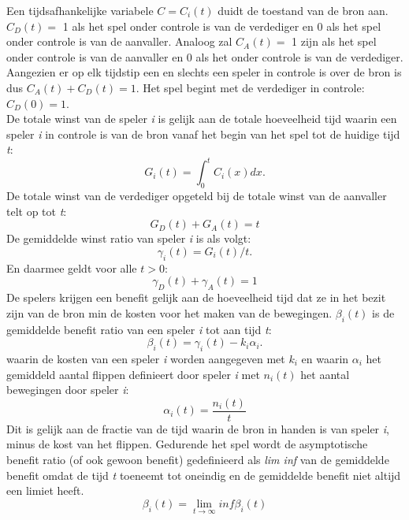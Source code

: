 \documentclass[master=cws, masteroption=vs,english]{kulemt}
\begin{document}
\begin{abstract*}
Een tijdsafhankelijke variabele $ C = C_{i}(t) $ duidt de toestand van de bron aan.
$ C_{D}(t) =$  1 als het spel onder controle is van de verdediger en 0 als het spel onder controle is van de aanvaller. Analoog zal $ C_{A}(t) =$ 1 zijn als het spel onder controle is van de aanvaller en 0 als het onder controle is van de verdediger. Aangezien er op elk tijdstip een en slechts een speler in controle is over de bron is dus  $ C_{A}(t) +  C_{D}(t) = 1 $.
Het spel begint met de verdediger in controle: $ C_{D}(0) = 1 $. \\



De totale winst van de speler \textit{i} is gelijk aan de totale hoeveelheid tijd waarin een speler \textit{i} in controle is van de bron vanaf het begin van het spel tot de huidige tijd \textit{t}:
\begin{equation}
G_{i}(t) = \int_0^t \! C_{i}(x) dx.
\end{equation}
De totale winst van de verdediger opgeteld bij de totale winst van de aanvaller telt op tot \textit{t}:
\begin{equation} 
G_{D}(t) + G_{A}(t) = t
\end{equation}
De gemiddelde winst ratio van speler \textit{i} is als volgt:
\begin{equation}
\gamma_{i}(t) = G_{i}(t) / t.
\end{equation}
En daarmee geldt voor alle $ t> 0 $:
\begin{equation} 
\gamma_{D}(t) + \gamma_{A}(t) = 1
\end{equation}
De spelers krijgen een benefit gelijk aan de hoeveelheid tijd dat ze in het bezit zijn van de bron min de kosten voor het maken van de bewegingen. 
$ \beta_{i}(t) $ is de gemiddelde benefit ratio van een speler \textit{i} tot aan tijd \textit{t}:
\begin{equation}
\beta_{i}(t) = \gamma_{i}(t) - k_{i} \alpha_{i}.
\end{equation}
waarin de kosten van een speler \textit{i} worden aangegeven met $ k_{i} $ en waarin $\alpha_{i}$ het gemiddeld aantal flippen definieert door speler \textit{i} met $n_{i}(t)$ het aantal bewegingen door speler \textit{i}:
\begin{equation}
\alpha_{i}(t) = \dfrac{n_{i}(t)}{t}
\end{equation}
Dit is gelijk aan de fractie van de tijd waarin de bron in handen is van speler \textit{i}, minus de kost van het flippen.
Gedurende het spel wordt de asymptotische benefit ratio (of ook gewoon benefit) gedefinieerd als \textit{lim inf} van de gemiddelde benefit omdat de tijd \textit{t} toeneemt tot oneindig en de gemiddelde benefit niet altijd een limiet heeft.
\begin{equation}
\beta_{i} (t) = \lim_{t \to \infty } inf \beta_{i}(t)
\end{equation}
\\



\end{abstract*}
\end{document}
